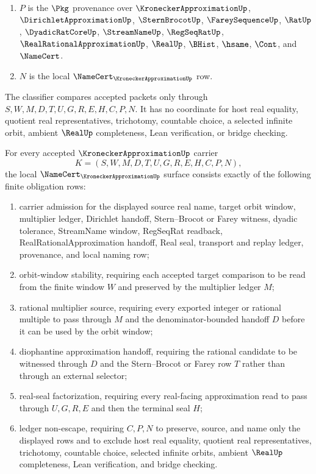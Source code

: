 \begin{definition}
\begin{enumerate}
\item $P$ is the $\Pkg$ provenance over $\KroneckerApproximationUp$, $\DirichletApproximationUp$, $\SternBrocotUp$, $\FareySequenceUp$, $\RatUp$, $\DyadicRatCoreUp$, $\StreamNameUp$, $\RegSeqRatUp$, $\RealRationalApproximationUp$, $\RealUp$, $\BHist$, $\hsame$, $\Cont$, and $\NameCert$.
\item $N$ is the local $\NameCert_{\KroneckerApproximationUp}$ row.
\end{enumerate}
The classifier compares accepted packets only through $S,W,M,D,T,U,G,R,E,H,C,P,N$. It has no coordinate for host real equality, quotient real representatives, trichotomy, countable choice, a selected infinite orbit, ambient $\RealUp$ completeness, Lean verification, or bridge checking.
\end{definition}

\begin{theorem}\label{thm:kronecker-approximation-namecert-obligations}
For every accepted $\KroneckerApproximationUp$ carrier
$$
K=(S,W,M,D,T,U,G,R,E,H,C,P,N),
$$
the local $\NameCert_{\KroneckerApproximationUp}$ surface consists exactly of the following finite obligation rows:
\begin{enumerate}
\item carrier admission for the displayed source real name, target orbit window, multiplier ledger, Dirichlet handoff, Stern--Brocot or Farey witness, dyadic tolerance, StreamName window, RegSeqRat readback, RealRationalApproximation handoff, Real seal, transport and replay ledger, provenance, and local naming row;
\item orbit-window stability, requiring each accepted target comparison to be read from the finite window $W$ and preserved by the multiplier ledger $M$;
\item rational multiplier source, requiring every exported integer or rational multiple to pass through $M$ and the denominator-bounded handoff $D$ before it can be used by the orbit window;
\item diophantine approximation handoff, requiring the rational candidate to be witnessed through $D$ and the Stern--Brocot or Farey row $T$ rather than through an external selector;
\item real-seal factorization, requiring every real-facing approximation read to pass through $U,G,R,E$ and then the terminal seal $H$;
\item ledger non-escape, requiring $C,P,N$ to preserve, source, and name only the displayed rows and to exclude host real equality, quotient real representatives, trichotomy, countable choice, selected infinite orbits, ambient $\RealUp$ completeness, Lean verification, and bridge checking.
\end{enumerate}
\end{theorem}

